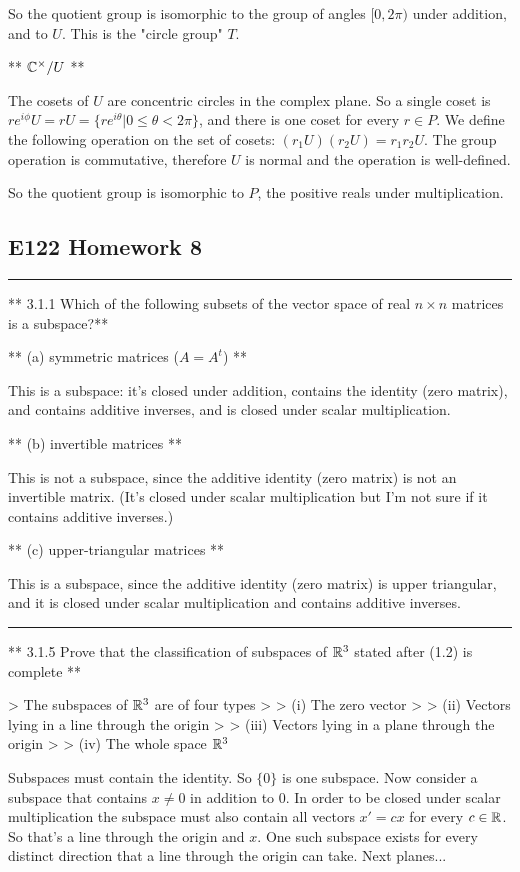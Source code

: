 So the quotient group is isomorphic to the group of angles $[0, 2\pi)$ under addition, and to $U$. This is the "circle group" $T$.


** $\mathbb{C}^\times / U$ **

The cosets of $U$ are concentric circles in the complex plane. So a single coset is $re^{i\phi}U = rU = \{re^{i\theta}|0\leq\theta<2\pi\}$, and there is one coset for every $r \in P$. We define the
following operation on the set of cosets: $(r_1U)(r_2U) = r_1r_2U$. The group operation is commutative, therefore $U$ is normal and the operation is well-defined.

So the quotient group is isomorphic to $P$, the positive reals under multiplication.

\subsection{E122 Homework 8}


\hrule

** 3.1.1 Which of the following subsets of the vector space of real $n \times
n$ matrices is a subspace?**

** (a) symmetric matrices ($A = A^t$) **

This is a subspace: it's closed under addition, contains the identity (zero
matrix), and contains additive inverses, and is closed under scalar
multiplication.

** (b) invertible matrices **

This is not a subspace, since the additive identity (zero matrix) is not an
invertible matrix. (It's closed under scalar multiplication but I'm not sure if
it contains additive inverses.)

** (c) upper-triangular matrices **

This is a subspace, since the additive identity (zero matrix) is upper
triangular, and it is closed under scalar multiplication and contains additive
inverses.

\hrule

** 3.1.5 Prove that the classification of subspaces of $\mathbb{R}^3$ stated after
(1.2) is complete **

> The subspaces of $\mathbb{R}^3$ are of four types
>
> (i) The zero vector
>
> (ii) Vectors lying in a line through the origin
>
> (iii) Vectors lying in a plane through the origin
>
> (iv) The whole space $\mathbb{R}^3$

Subspaces must contain the identity. So $\{0\}$ is one subspace. Now consider a
subspace that contains $x \neq 0$ in addition to $0$. In order to be closed
under scalar multiplication the subspace must also contain all vectors $x' =
cx$ for every $c \in \mathbb{R}$. So that's a line through the origin and $x$. One such
subspace exists for every distinct direction that a line through the origin can
take. Next planes...


